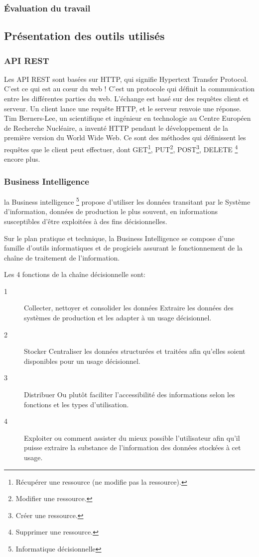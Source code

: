 \subsubsection{Évaluation du travail}
\subsection{Présentation des outils utilisés}
\subsubsection{API REST}
Les API REST sont basées sur HTTP, qui signifie Hypertext Transfer Protocol.
C’est ce qui est au cœur du web ! C’est un protocole qui définit la communication
entre les différentes parties du web. L’échange est basé sur des requêtes client et serveur.
Un client lance une requête HTTP, et le serveur renvoie une réponse. Tim Berners-Lee, 
un scientifique et ingénieur en technologie au Centre Européen de Recherche Nucléaire, 
a inventé HTTP pendant le développement de la première version du World Wide Web. 
Ce sont des méthodes qui définissent les requêtes que le client peut effectuer,
dont GET\footnote{ Récupérer une ressource (ne modifie pas la ressource).}, PUT\footnote{Modifier une ressource.},
POST\footnote{ Créer une ressource.}, DELETE \footnote{Supprimer une ressource.} encore plus. 

\subsubsection{Business Intelligence}

la Business intelligence \footnote{Informatique décisionnelle} propose d'utiliser 
les données transitant par le Système
d'information, données de production le plus souvent, en informations susceptibles 
d'être exploitées à des fins décisionnelles. 

Sur le plan pratique et technique, la Business Intelligence se compose d'une famille 
d'outils informatiques et 
de progiciels assurant le fonctionnement de la chaîne de traitement de l'information. 

Les 4 fonctions de la chaîne décisionnelle sont:
\begin{description}
 \item [1] Collecter, nettoyer et consolider les données Extraire les données 
 des systèmes de production et les adapter à un usage décisionnel. 
 \item [2] Stocker Centraliser les données structurées et traitées afin qu'elles
 soient disponibles pour un usage décisionnel. 
 \item [3] Distribuer Ou plutôt faciliter l'accessibilité des informations selon 
 les fonctions et les types d'utilisation. 
 \item [4] Exploiter ou comment assister du mieux possible l'utilisateur afin qu'il puisse extraire 
 la substance de l'information des données stockées à cet usage. 
\end{description}

